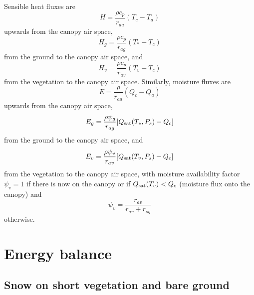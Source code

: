 \documentclass{article}
\begin{document}
Sensible heat fluxes are 
\begin{equation}
H = \frac{\rho c_p}{r_{aa}}(T_c - T_a)
\label{eq:H}
\end{equation}
upwards from the canopy air space,
\begin{equation}
H_g = \frac{\rho c_p}{r_{ag}}(T_* - T_c)
\end{equation}
from the ground to the canopy air space, and
\begin{equation}
H_v = \frac{\rho c_p}{r_{av}}(T_v - T_c)
\label{eq:Hv}
\end{equation}
from the vegetation to the canopy air space. Similarly, moisture fluxes are  
\begin{equation}
E = \frac{\rho}{r_{aa}}(Q_c - Q_a)
\end{equation}
upwards from the canopy air space,
\begin{equation}
E_g = \frac{\rho \psi_g}{r_{ag}}[Q_{\rm sat}(T_*,P_s) - Q_c]
\end{equation}
from the ground to the canopy air space, and
\begin{equation}
E_v = \frac{\rho \psi_v}{r_{av}}[Q_{\rm sat}(T_v,P_s) - Q_c]
\label{eq:Ev}
\end{equation}
from the vegetation to the canopy air space, with moisture availability factor $\psi_v=1$ if there is now on the canopy or if $Q_{\rm sat}(T_v)<Q_c$ (moisture flux onto the canopy) and
\begin{equation}
\psi_v = \frac{r_{av}}{r_{av}+r_{sg}}
\end{equation}
otherwise.

\section{Energy balance}

\subsection{Snow on short vegetation and bare ground}
\end{document}
